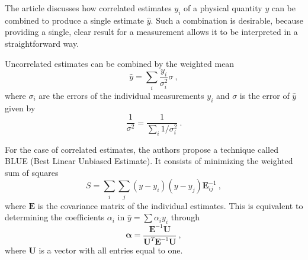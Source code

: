 

\usetikzlibrary{calc}
\usetikzlibrary{arrows,shapes}

\newcommand{\package}[1]{\texttt{#1}}
\newcommand{\class}[1]{\texttt{#1}}
\newcommand{\function}[1]{\texttt{#1}}
\newcommand{\fpath}[1]{\texttt{#1}}

\captionsetup{width=0.45\textwidth}

\newcommand{\eg}{e.g.\@ }

\usepackage{hyphenat}




The article\cite{lyons} discusses how correlated estimates $y_i$ of a physical quantity $y$ can be combined to produce a single estimate $\hat{y}$.
Such a combination is desirable, because providing a single, clear result for a measurement allows it to be interpreted in a straightforward way.

Uncorrelated estimates can be combined by the weighted mean
\begin{equation}
  \hat{y} = \sum_i{\frac{y_i}{\sigma_i^2}} σ\:,
\end{equation}
where $σ_i$ are the errors of the individual measurements $y_i$ and $σ$ is the error of $\hat{y}$ given by
\begin{equation}
  \frac{1}{σ^2} = \frac{1}{\sum_i 1/σ_i^2 }\:.
\end{equation}

For the case of correlated estimates, the authors propose a technique called BLUE (Best Linear Unbiased Estimate).
It consists of minimizing the weighted sum of squares
\begin{equation}
  S = \sum_i \sum_j (y - y_i) (y - y_j) \mathbf{E}^{-1}_{ij}\:,
  \label{squares}
\end{equation}
where $\mathbf{E}$ is the covariance matrix of the individual estimates.
This is equivalent to determining the coefficients $α_i$ in $\hat{y} = \sum \alpha_i y_i$ through
\begin{equation}
  \mathbf{\alpha} = \frac{\mathbf{E}^{-1} \mathbf{U}}{\mathbf{U}^T \mathbf{E}^{-1} \mathbf{U}}\:,
\end{equation}
where $\mathbf{U}$ is a vector with all entries equal to one.

